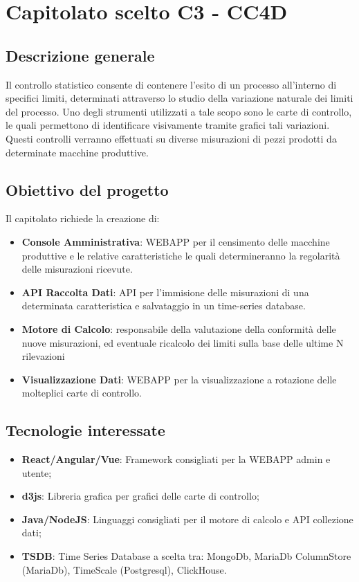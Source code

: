 \section{Capitolato scelto C3 - CC4D}\label{section:c3}
\subsection{Descrizione generale}
Il controllo statistico consente di contenere l'esito di un processo all'interno di specifici limiti, determinati attraverso lo studio della variazione naturale dei limiti del processo. Uno degli strumenti utilizzati a tale scopo sono le carte di controllo, le quali permettono di identificare visivamente tramite grafici tali variazioni. Questi controlli verranno effettuati su diverse misurazioni di pezzi prodotti da determinate macchine produttive.

\subsection{Obiettivo del progetto}
Il capitolato richiede la creazione di:
\begin{itemize}
	\item \textbf{Console Amministrativa}: WEBAPP per il censimento delle macchine produttive e le relative caratteristiche le quali determineranno la regolarità delle misurazioni ricevute.
	\item \textbf{API Raccolta Dati}: API per l'immisione delle misurazioni di una determinata caratteristica e salvataggio in un time-series database. 
	\item \textbf{Motore di Calcolo}: responsabile della valutazione della conformità delle nuove misurazioni, ed eventuale ricalcolo dei limiti sulla base delle ultime N rilevazioni
	\item \textbf{Visualizzazione Dati}: WEBAPP per la visualizzazione a rotazione delle molteplici carte di controllo.
\end{itemize}

\subsection{Tecnologie interessate}
\begin{itemize}
	\item \textbf{React/Angular/Vue}: Framework consigliati per la WEBAPP admin e utente;
	\item \textbf{d3js}: Libreria grafica per grafici delle carte di controllo;
	\item \textbf{Java/NodeJS}: Linguaggi consigliati per il motore di calcolo e API collezione dati;
	\item \textbf{TSDB}: Time Series Database a scelta tra: MongoDb, MariaDb ColumnStore (MariaDb), TimeScale (Postgresql), ClickHouse.
\end{itemize}
